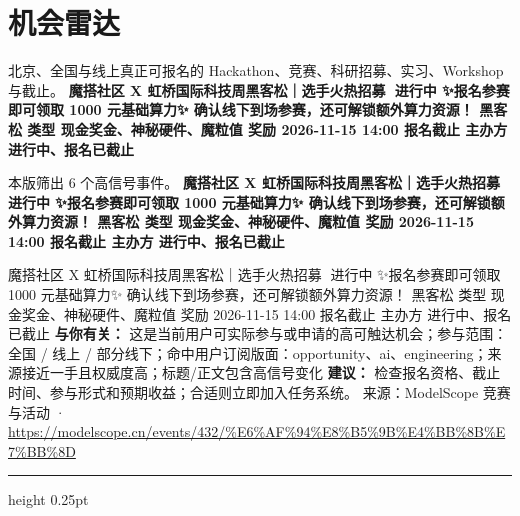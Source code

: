 \documentclass[10.5pt]{ctexart}
\begin{document}
\section*{机会雷达}
{\color{ormuted} 北京、全国与线上真正可报名的 Hackathon、竞赛、科研招募、实习、Workshop 与截止。}
\vspace{2mm}
{\LARGE\bfseries 魔搭社区 X 虹桥国际科技周黑客松｜选手火热招募🚀 进行中 ✨报名参赛即可领取 1000 元基础算力✨ 确认线下到场参赛，还可解锁额外算力资源！ 黑客松 类型 现金奖金、神秘硬件、魔粒值 奖励 2026-11-15 14:00 报名截止 主办方 进行中、报名已截止}\par
\vspace{1mm}
{\color{ormuted} 本版筛出 6 个高信号事件。}
\vspace{3mm}
{\Large\bfseries 魔搭社区 X 虹桥国际科技周黑客松｜选手火热招募🚀 进行中 ✨报名参赛即可领取 1000 元基础算力✨ 确认线下到场参赛，还可解锁额外算力资源！ 黑客松 类型 现金奖金、神秘硬件、魔粒值 奖励 2026-11-15 14:00 报名截止 主办方 进行中、报名已截止}\par
魔搭社区 X 虹桥国际科技周黑客松｜选手火热招募🚀 进行中 ✨报名参赛即可领取 1000 元基础算力✨ 确认线下到场参赛，还可解锁额外算力资源！ 黑客松 类型 现金奖金、神秘硬件、魔粒值 奖励 2026-11-15 14:00 报名截止 主办方 进行中、报名已截止
\textbf{与你有关：} 这是当前用户可实际参与或申请的高可触达机会；参与范围：全国 / 线上 / 部分线下；命中用户订阅版面：opportunity、ai、engineering；来源接近一手且权威度高；标题/正文包含高信号变化
\textbf{建议：} 检查报名资格、截止时间、参与形式和预期收益；合适则立即加入任务系统。
{\footnotesize\color{ormuted} 来源：ModelScope 竞赛与活动 · \url{https://modelscope.cn/events/432/%E6%AF%94%E8%B5%9B%E4%BB%8B%E7%BB%8D}}
\vspace{4mm}
\hrule height 0.25pt
\vspace{3mm}
\end{document}
